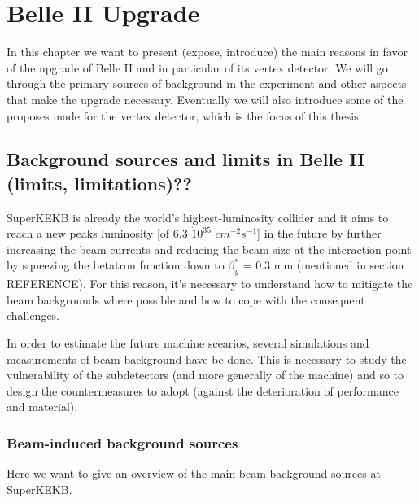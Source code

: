 \chapter{Belle II Upgrade}

In this chapter we want to present (expose, introduce) the main reasons in favor of the upgrade of Belle II and in particular of its vertex detector. We will go through the primary sources of background in the experiment and other aspects that make the upgrade necessary. Eventually we will also introduce some of the proposes made for the vertex detector, which is the focus of this thesis.


\section{Background sources and limits in Belle II (limits, limitations)??}

SuperKEKB is already the world's highest-luminosity collider and it aims to reach a new peaks luminosity [of 6.3 $\dot 10^{35}$ $cm^{-2}s^{-1}$] in the future by further increasing the beam-currents and reducing the beam-size at the interaction point by squeezing the betatron function down to $\beta^{*}_{y}$ = 0.3 mm (mentioned in section REFERENCE). For this reason, it's necessary to understand how to mitigate the beam backgrounds where possible and how to cope with the consequent challenges. 

In order to estimate the future machine scearios, several simulations and measurements of beam background have be done. This is necessary to study the vulnerability of the subdetectors (and more generally of the machine) and so to design the countermeasures to adopt (against the deterioration of performance and material). 

\subsection{Beam-induced background sources}

Here we want to give an overview of the main beam background sources at SuperKEKB. 

